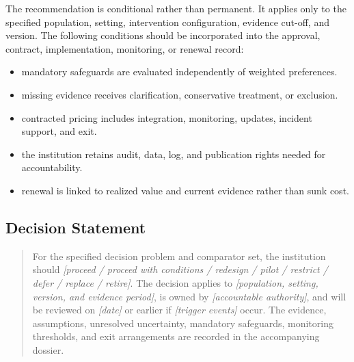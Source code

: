 The recommendation is conditional rather than permanent. It applies only to the
specified population, setting, intervention configuration, evidence cut-off, and
version. The following conditions should be incorporated into the approval,
contract, implementation, monitoring, or renewal record:

\begin{itemize}
 \item mandatory safeguards are evaluated independently of weighted preferences.
 \item missing evidence receives clarification, conservative treatment, or exclusion.
 \item contracted pricing includes integration, monitoring, updates, incident support, and exit.
 \item the institution retains audit, data, log, and publication rights needed for accountability.
 \item renewal is linked to realized value and current evidence rather than sunk cost.
\end{itemize}

\subsection{Decision Statement}
\begin{quote}
For the specified decision problem and comparator set, the institution should
\emph{[proceed / proceed with conditions / redesign / pilot / restrict / defer /
replace / retire]}. The decision applies to \emph{[population, setting, version,
and evidence period]}, is owned by \emph{[accountable authority]}, and will be
reviewed on \emph{[date]} or earlier if \emph{[trigger events]} occur. The
evidence, assumptions, unresolved uncertainty, mandatory safeguards, monitoring
thresholds, and exit arrangements are recorded in the accompanying dossier.
\end{quote}
